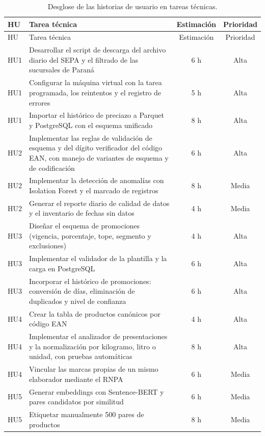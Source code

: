 \documentclass[
11pt, %
]{charter}
\begin{document}
\begin{longtable}{@{}|p{1.3cm}|p{9.3cm}|c|c|@{}}
\caption{Desglose de las historias de usuario en tareas técnicas.}
\label{tab:tareas}\\
\hline
\rowcolor[HTML]{C0C0C0}
HU & Tarea técnica & Estimación & Prioridad \\ \hline
\endfirsthead
\hline
\rowcolor[HTML]{C0C0C0}
HU & Tarea técnica & Estimación & Prioridad \\ \hline
\endhead
HU1 & Desarrollar el script de descarga del archivo diario del SEPA y el filtrado de las sucursales de Paraná & 6 h & Alta \\ \hline
HU1 & Configurar la máquina virtual con la tarea programada, los reintentos y el registro de errores & 5 h & Alta \\ \hline
HU1 & Importar el histórico de preciazo a Parquet y PostgreSQL con el esquema unificado & 8 h & Alta \\ \hline
HU2 & Implementar las reglas de validación de esquema y del dígito verificador del código EAN, con manejo de variantes de esquema y de codificación & 6 h & Alta \\ \hline
HU2 & Implementar la detección de anomalías con Isolation Forest y el marcado de registros & 8 h & Media \\ \hline
HU2 & Generar el reporte diario de calidad de datos y el inventario de fechas sin datos & 4 h & Media \\ \hline
HU3 & Diseñar el esquema de promociones (vigencia, porcentaje, tope, segmento y exclusiones) & 4 h & Alta \\ \hline
HU3 & Implementar el validador de la plantilla y la carga en PostgreSQL & 6 h & Alta \\ \hline
HU3 & Incorporar el histórico de promociones: conversión de días, eliminación de duplicados y nivel de confianza & 6 h & Alta \\ \hline
HU4 & Crear la tabla de productos canónicos por código EAN & 4 h & Alta \\ \hline
HU4 & Implementar el analizador de presentaciones y la normalización por kilogramo, litro o unidad, con pruebas automáticas & 8 h & Alta \\ \hline
HU4 & Vincular las marcas propias de un mismo elaborador mediante el RNPA & 6 h & Media \\ \hline
HU5 & Generar embeddings con Sentence-BERT y pares candidatos por similitud & 6 h & Media \\ \hline
HU5 & Etiquetar manualmente 500 pares de productos & 8 h & Media \\ \hline

\end{longtable}
\end{document}
